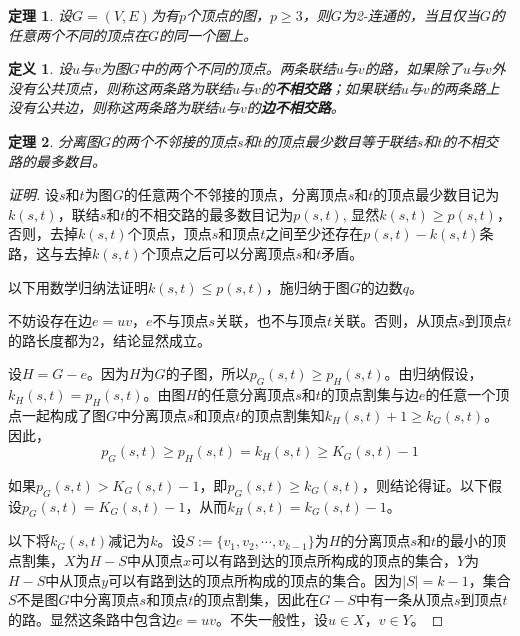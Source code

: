 \documentclass{book}[oneside]
\newtheorem{Def}{定义}[chapter]
\newtheorem{Thm}{定理}[chapter]
\begin{document}
\begin{CJK*}{UTF8}{gbsn}
    \begin{Thm}
    设$G=(V,E)$为有$p$个顶点的图，$p \geq 3$，则$G$为2-连通的，当且仅当$G$的任意两个不同的顶点在$G$的同一个圈上。
  \end{Thm}
  \begin{Def}
    设$u$与$v$为图$G$中的两个不同的顶点。两条联结$u$与$v$的路，如果除了$u$与$v$外没有公共顶点，则称这两条路为联结$u$与$v$的{\bfseries 不相交路}；如果联结$u$与$v$的两条路上没有公共边，则称这两条路为联结$u$与$v$的{\bfseries 边不相交路}。
  \end{Def}
  \begin{Thm}
    分离图$G$的两个不邻接的顶点$s$和$t$的顶点最少数目等于联结$s$和$t$的不相交路的最多数目。
  \end{Thm}
  \begin{proof}[证明]\justifying\let\raggedright\justifying
    设$s$和$t$为图$G$的任意两个不邻接的顶点，分离顶点$s$和$t$的顶点最少数目记为$k(s,t)$，联结$s$和$t$的不相交路的最多数目记为$p(s,t)$,
    显然$k(s,t)\geq p(s,t)$，否则，去掉$k(s,t)$个顶点，顶点$s$和顶点$t$之间至少还存在$p(s,t)-k(s,t)$条路，这与去掉$k(s,t)$个顶点之后可以分离顶点$s$和$t$矛盾。
    
    以下用数学归纳法证明$k(s,t)\leq p(s,t)$，施归纳于图$G$的边数$q$。

    不妨设存在边$e=uv$，$e$不与顶点$s$关联，也不与顶点$t$关联。否则，从顶点$s$到顶点$t$的路长度都为$2$，结论显然成立。

    设$H=G-e$。因为$H$为$G$的子图，所以$p_G(s,t)\geq p_H(s,t)$。由归纳假设，$k_H(s,t) = p_H(s,t)$。由图$H$的任意分离顶点$s$和$t$的顶点割集与边$e$的任意一个顶点一起构成了图$G$中分离顶点$s$和顶点$t$的顶点割集知$k_H(s,t) + 1 \geq k_G(s,t)$。因此，
    \[p_G(s,t)\geq p_H(s,t) = k_H(s,t) \geq K_G(s,t) - 1\]

    如果$p_G(s,t) > K_G(s,t) - 1$，即$p_G(s,t) \geq k_G(s,t)$，则结论得证。以下假设$p_G(s,t) = K_G(s,t) - 1$，从而$k_H(s,t) = k_G(s,t) - 1$。

   以下将$k_{G}(s,t)$减记为$k$。设$S:=\{v_1,v_2,\cdots, v_{k-1}\}$为$H$的分离顶点$s$和$t$的最小的顶点割集，$X$为$H-S$中从顶点$x$可以有路到达的顶点所构成的顶点的集合，$Y$为$H-S$中从顶点$y$可以有路到达的顶点所构成的顶点的集合。因为$|S|=k - 1$，集合$S$不是图$G$中分离顶点$s$和顶点$t$的顶点割集，因此在$G-S$中有一条从顶点$s$到顶点$t$的路。显然这条路中包含边$e=uv$。不失一般性，设$u\in X$，$v\in Y$。


\end{proof}
\end{CJK*}
\end{document}
